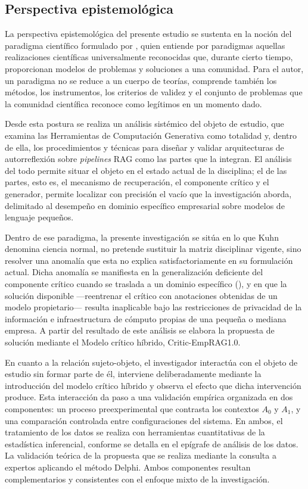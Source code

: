
\subsection{Perspectiva epistemológica}\label{sec:perspectiva-epistemologica}

La perspectiva epistemológica del presente estudio se sustenta en la noción del paradigma científico formulado por \textcite{Kuhn1971revoluciones}, quien entiende por paradigmas aquellas realizaciones científicas universalmente reconocidas que, durante cierto tiempo, proporcionan modelos de problemas y soluciones a una comunidad. Para el autor, un paradigma no se reduce a un cuerpo de teorías, comprende también los métodos, los instrumentos, los criterios de validez y el conjunto de problemas que la comunidad científica reconoce como legítimos en un momento dado.

Desde esta postura se realiza un análisis sistémico del objeto de estudio, que examina las Herramientas de Computación Generativa como totalidad y, dentro de ella, los procedimientos y técnicas para diseñar y validar arquitecturas de autorreflexión sobre \textit{pipelines} RAG como las partes que la integran. El análisis del todo permite situar el objeto en el estado actual de la disciplina; el de las partes, esto es, el mecanismo de recuperación, el componente crítico y el generador, permite localizar con precisión el vacío que la investigación aborda, delimitado al desempeño en dominio específico empresarial sobre modelos de lenguaje pequeños.

Dentro de ese paradigma, la presente investigación se sitúa en lo que Kuhn denomina ciencia normal, no pretende sustituir la matriz disciplinar vigente, sino resolver una anomalía que esta no explica satisfactoriamente en su formulación actual. Dicha anomalía se manifiesta en la generalización deficiente del componente crítico cuando se traslada a un dominio específico (\cite{jeong_improving_2024}), y en que la solución disponible ---reentrenar el crítico con anotaciones obtenidas de un modelo propietario--- resulta inaplicable bajo las restricciones de privacidad de la información e infraestructura de cómputo propias de una pequeña o mediana empresa. A partir del resultado de este análisis se elabora la propuesta de solución mediante el Modelo crítico híbrido, Critic-EmpRAG1.0.

En cuanto a la relación sujeto-objeto, el investigador interactúa con el objeto de estudio sin formar parte de él, interviene deliberadamente mediante la introducción del modelo crítico híbrido y observa el efecto que dicha intervención produce. Esta interacción da paso a una validación empírica organizada en dos componentes: un proceso preexperimental que contrasta los contextos $A_0$ y $A_1$, y una comparación controlada entre configuraciones del sistema. En ambos, el tratamiento de los datos se realiza con herramientas cuantitativas de la estadística inferencial, conforme se detalla en el epígrafe de análisis de los datos. La validación teórica de la propuesta que se realiza mediante la consulta a expertos aplicando el método Delphi. Ambos componentes resultan complementarios y consistentes con el enfoque mixto de la investigación.

